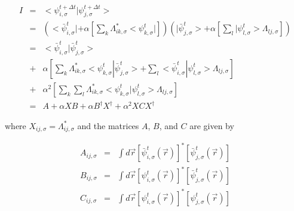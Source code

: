 \begin{eqnarray}
I &=& <\psi_{i,\sigma}^{t+\Delta t} | \psi_{j,\sigma}^{t+\Delta t}> \nonumber \\
  &=& 
   \left( <\bar{\psi}_{i,\sigma}^{t}| 
          + \alpha  
            \left[
                   \sum_{k} \Lambda_{ik,\sigma}^{*} <\psi_{k,\sigma}^{t}|
            \right]
   \right)
   \left( |\bar{\psi}_{j,\sigma}^{t}> 
          + \alpha  
            \left[
                   \sum_{l} |\psi_{l,\sigma}^{t}> \Lambda_{lj,\sigma} 
            \right]
   \right) \nonumber \\
  &=& <\bar{\psi}_{i,\sigma}^{t}| \bar{\psi}_{j,\sigma}^{t}> \nonumber \\
  &+& \alpha 
       \left[
          \sum_{k} \Lambda_{ik,\sigma}^{*} 
                     <\psi_{k,\sigma}^{t}| \bar{\psi}_{j,\sigma}^{t}> 
         + \sum_{l} <\bar{\psi}_{i,\sigma}^{t}| \psi_{l,\sigma}^{t}>
                    \Lambda_{lj,\sigma} 
       \right] \nonumber \\
  &+& \alpha^2 
       \left[
                \sum_{k} \sum_{l}
                 \Lambda_{ik,\sigma}^{*} 
                 <\psi_{k,\sigma}^{t}|\psi_{l,\sigma}^{t}>
                 \Lambda_{lj,\sigma} 
       \right] \nonumber \\
  &=& A + \alpha XB + \alpha B^{\dag}X^{\dag} + \alpha^2 XCX^{\dag} 
\label{eq:b9}
\end{eqnarray}

\noindent
where $X_{ij,\sigma}=\Lambda_{ij,\sigma}^{*}$ and the matrices 
$A$, $B$, and $C$ are given by

\begin{eqnarray}
A_{ij,\sigma} &=& \int d\vec{r} 
             \left[\bar{\psi}_{i,\sigma}^{t}(\vec{r}) 
             \right]^{*} 
             \left[\bar{\psi}_{j,\sigma}^{t}(\vec{r}) 
             \right] \\
B_{ij,\sigma} &=& \int d\vec{r} 
             \left[\psi_{i,\sigma}^{t}(\vec{r}) 
             \right]^{*} 
             \left[\bar{\psi}_{j,\sigma}^{t}(\vec{r}) 
             \right] \\
C_{ij,\sigma} &=& \int d\vec{r} 
             \left[\psi_{i,\sigma}^{t}(\vec{r}) 
             \right]^{*} 
             \left[\psi_{j,\sigma}^{t}(\vec{r}) 
             \right]
\end{eqnarray}

